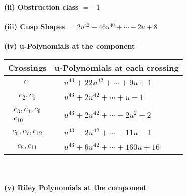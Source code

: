 \documentclass[1p]{elsarticle_modified}
\theoremstyle{definition}
\begin{document}
\flushleft \textbf{(ii) Obstruction class $= -1$}\\~\\
\flushleft \textbf{(iii) Cusp Shapes $= 2 u^{42}-46 u^{40}+\cdots-2 u+8$}\\~\\
\newpage\renewcommand{\arraystretch}{1}
\flushleft \textbf{(iv) u-Polynomials at the component}\newline \\
\begin{tabular}{m{50pt}|m{274pt}}
Crossings & \hspace{64pt}u-Polynomials at each crossing \\
\hline $$\begin{aligned}c_{1}\end{aligned}$$&$\begin{aligned}
&u^{43}+22 u^{42}+\cdots+9 u+1
\end{aligned}$\\
\hline $$\begin{aligned}c_{2},c_{5}\end{aligned}$$&$\begin{aligned}
&u^{43}+2 u^{42}+\cdots+u-1
\end{aligned}$\\
\hline $$\begin{aligned}c_{3},c_{4},c_{9}\\c_{10}\end{aligned}$$&$\begin{aligned}
&u^{43}+2 u^{42}+\cdots-2 u^2+2
\end{aligned}$\\
\hline $$\begin{aligned}c_{6},c_{7},c_{12}\end{aligned}$$&$\begin{aligned}
&u^{43}-2 u^{42}+\cdots-11 u-1
\end{aligned}$\\
\hline $$\begin{aligned}c_{8},c_{11}\end{aligned}$$&$\begin{aligned}
&u^{43}+6 u^{42}+\cdots+160 u+16
\end{aligned}$\\
\hline
\end{tabular}\\~\\
\newpage\renewcommand{\arraystretch}{1}
\flushleft \textbf{(v) Riley Polynomials at the component}\newline \\
\end{document}
